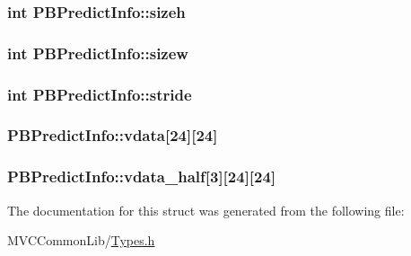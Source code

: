 \label{struct_p_b_predict_info_a7c7d2c72aa539c0e2365b4e04e18a0ca}
\hypertarget{struct_p_b_predict_info_a22f7b2cc9619bf678980e45fc9ef7f1b}{
\subsubsection[{sizeh}]{\setlength{\rightskip}{0pt plus 5cm}int {\bf PBPredictInfo::sizeh}}}
\label{struct_p_b_predict_info_a22f7b2cc9619bf678980e45fc9ef7f1b}
\hypertarget{struct_p_b_predict_info_a26162322380d1afd96ee0c894f6ee08e}{
\subsubsection[{sizew}]{\setlength{\rightskip}{0pt plus 5cm}int {\bf PBPredictInfo::sizew}}}
\label{struct_p_b_predict_info_a26162322380d1afd96ee0c894f6ee08e}
\hypertarget{struct_p_b_predict_info_a96c9413deeef7bfcd16237bfef11c8ae}{
\subsubsection[{stride}]{\setlength{\rightskip}{0pt plus 5cm}int {\bf PBPredictInfo::stride}}}
\label{struct_p_b_predict_info_a96c9413deeef7bfcd16237bfef11c8ae}
\hypertarget{struct_p_b_predict_info_aaa7f5b9d6def9506a306d9e5fdf0c7f4}{
\subsubsection[{vdata}]{ {\bf PBPredictInfo::vdata}\mbox{[}24\mbox{]}\mbox{[}24\mbox{]}}}
\label{struct_p_b_predict_info_aaa7f5b9d6def9506a306d9e5fdf0c7f4}
\hypertarget{struct_p_b_predict_info_ae10de4e25fedb10d0ea1dbaf3b34c4ac}{
\subsubsection[{vdata\_\-half}]{ {\bf PBPredictInfo::vdata\_\-half}\mbox{[}3\mbox{]}\mbox{[}24\mbox{]}\mbox{[}24\mbox{]}}}
\label{struct_p_b_predict_info_ae10de4e25fedb10d0ea1dbaf3b34c4ac}


The documentation for this struct was generated from the following file:\begin{DoxyCompactItemize}
\item 
MVCCommonLib/\hyperlink{_types_8h}{Types.h}\end{DoxyCompactItemize}
